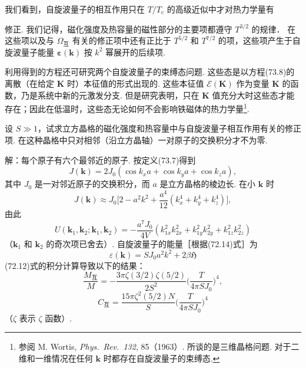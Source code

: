 我们看到，自旋波量子的相互作用只在 $T/T_{\mathrm{c}}$ 的高级近似中才对热力学量有

修正. 我们记得，磁化强度及热容量的磁性部分的主要项都遵守 $T^{3/2}$ 的规律． 在这些项以及与 $\varOmega_{\text{互}}$ 有关的修正项中还有正比于 $T^{5/2}$ 和 $T^{7/2}$ 的项，这些项产生于自旋波量子能量 $\bm{\varepsilon}(\bm{k})$ 按 $k^2$ 幂展开的后续项.

利用得到的方程还可研究两个自旋波量子的束缚态问题. 这些态是以方程(73.8)的离散（在给定 $\bm{K}$ 时）本征值的形式出现的. 这些本征值 $\mathcal{E}(\bm{K})$ 作为变量 $\bm{K}$ 的函数，乃是系统中新的元激发分支. 但是研究表明，只在 $\bm{K}$ 值充分大时这些态才能存在；因此在低温时，这些态无论如何不会影响铁磁体的热力学量\footnote{参阅 M. Wortis, \textit{Phys.\ Rev.\ 132}, 85（1963）. 所谈的是三维晶格问题. 对于二维和一维情况在任何 $\bm{k}$ 时都存在自旋波量子的束缚态.}.

\begin{xiti}

设 $S\gg1$，试求立方晶格的磁化强度和热容量中与自旋波量子相互作用有关的修正项. 在这种晶格中只对相邻（沿立方晶轴）一对原子的交换积分才不为零.

{\heiti 解：}每个原子有六个最邻近的原子. 按定义(73.7)得到
\begin{equation*}
J(\bm{k})=2J_0(\cos k_xa+\cos k_ya+\cos k_za),
\end{equation*}
其中 $J_0$ 是一对邻近原子的交换积分，而 $a$ 是立方晶格的棱边长. 在小 $\bm{k}$ 时
\begin{equation*}
J(\bm{k})\approx J_0\biggl[2-a^2k^2+\frac{a^4}{12}
(k_x^4+k_y^4+k_z^4)\biggr],
\end{equation*}
由此
\begin{equation*}
U(\bm{k}_1,\bm{k}_2;\bm{k}_1,\bm{k}_2)
=-\frac{a^7J_0}{4V}(k_{1x}^2k_{2x}^2+k_{1y}^2k_{2y}^2+k_{1z}^2k_{2z}^2)
\end{equation*}
（$\bm{k}_1$ 和 $\bm{k}_2$ 的奇次项已舍去）. 自旋波量子的能量［根据(72.14)式］为
\begin{equation*}
\varepsilon(\bm{k})=SJ_0a^2k^2+2\beta\mathfrak{H}
\end{equation*}
(72.12)式的积分计算导致以下的结果：
\begin{equation*}
\frac{M_{\text{互}}}{M}=-\frac{3\pi\zeta(3/2)\zeta(5/2)}{2S^2}
\biggl(\frac{T}{4\pi SJ_0}\biggr)^{\!4},
\end{equation*}
\begin{equation*}
C_{\text{互}}=\frac{15\pi\zeta^2(5/2)N}{S}
\biggl(\frac{T}{4\pi SJ_0}\biggr)^{\!4}
\end{equation*}
（$\zeta$ 表示 $\zeta$ 函数）.

\end{xiti}

